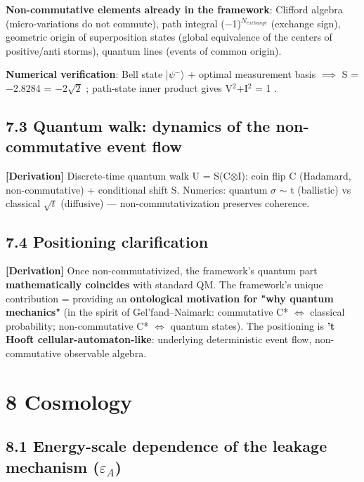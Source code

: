 \documentclass[12pt]{article}
\newcommand{\mtag}[1]{\textbf{[#1]}}
\newcommand{\up}[1]{\ensuremath{^{#1}}}
\newcommand{\down}[1]{\ensuremath{_{#1}}}
\begin{document}
\textbf{Non-commutative elements already in the framework}: Clifford algebra (micro-variations do not commute), path integral (\ensuremath{-}1)\up{N\down{exchange}} (exchange sign), geometric origin of superposition states (global equivalence of the centers of positive/anti storms), quantum lines (events of common origin).

\textbf{Numerical verification}: Bell state |\ensuremath{\psi}\up{-}\ensuremath{\rangle} + optimal measurement basis \ensuremath{\implies} S = \ensuremath{-}2.8284 = \ensuremath{-}2\ensuremath{\sqrt{2}} \checkmark; path-state inner product gives V\up{2}+I\up{2} = 1 \checkmark.

\subsection{7.3 Quantum walk: dynamics of the non-commutative event flow}

\mtag{Derivation} Discrete-time quantum walk U = S(C\ensuremath{\otimes}I): coin flip C (Hadamard, non-commutative) + conditional shift S. Numerics: quantum \ensuremath{\sigma} \ensuremath{\sim} t (ballistic) vs classical \ensuremath{\sqrt{t}} (diffusive) --- non-commutativization preserves coherence.

\subsection{7.4 Positioning clarification}

\mtag{Derivation} Once non-commutativized, the framework's quantum part \textbf{mathematically coincides} with standard QM. The framework's unique contribution = providing an \textbf{ontological motivation for "why quantum mechanics"} (in the spirit of Gel'fand--Naimark: commutative C* \ensuremath{\iff} classical probability; non-commutative C* \ensuremath{\iff} quantum states). The positioning is \textbf{'t Hooft cellular-automaton-like}: underlying deterministic event flow, non-commutative observable algebra.



\section{8 Cosmology}

\subsection{8.1 Energy-scale dependence of the leakage mechanism (\ensuremath{\varepsilon}\down{A})}
\end{document}
